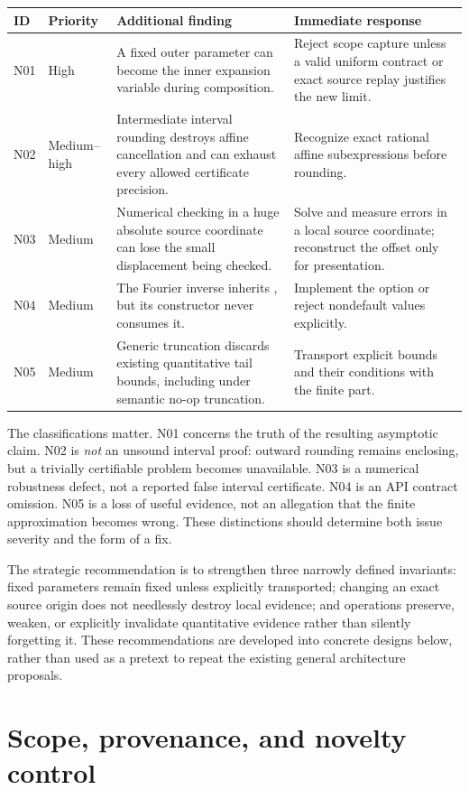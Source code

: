 \documentclass[11pt,a4paper]{article}
\newcommand{\code}[1]{\texttt{\detokenize{#1}}}
\begin{document}
\begin{longtable}{@{}L{11mm}L{20mm}L{57mm}L{69mm}@{}}
\toprule ID & Priority & Additional finding & Immediate response\\\midrule\endhead
N01 & High & A fixed outer parameter can become the inner expansion variable during composition. & Reject scope capture unless a valid uniform contract or exact source replay justifies the new limit.\\
N02 & Medium--high & Intermediate interval rounding destroys affine cancellation and can exhaust every allowed certificate precision. & Recognize exact rational affine subexpressions before rounding.\\
N03 & Medium & Numerical checking in a huge absolute source coordinate can lose the small displacement being checked. & Solve and measure errors in a local source coordinate; reconstruct the offset only for presentation.\\
N04 & Medium & The Fourier inverse inherits \code{SeriesTermGoal}, but its constructor never consumes it. & Implement the option or reject nondefault values explicitly.\\
N05 & Medium & Generic truncation discards existing quantitative tail bounds, including under semantic no-op truncation. & Transport explicit bounds and their conditions with the finite part.\\
\bottomrule
\end{longtable}

The classifications matter. N01 concerns the truth of the resulting asymptotic claim. N02 is \emph{not} an unsound interval proof: outward rounding remains enclosing, but a trivially certifiable problem becomes unavailable. N03 is a numerical robustness defect, not a reported false interval certificate. N04 is an API contract omission. N05 is a loss of useful evidence, not an allegation that the finite approximation becomes wrong. These distinctions should determine both issue severity and the form of a fix.

The strategic recommendation is to strengthen three narrowly defined invariants: fixed parameters remain fixed unless explicitly transported; changing an exact source origin does not needlessly destroy local evidence; and operations preserve, weaken, or explicitly invalidate quantitative evidence rather than silently forgetting it. These recommendations are developed into concrete designs below, rather than used as a pretext to repeat the existing general architecture proposals.

\section{Scope, provenance, and novelty control}\label{sec:scope}
\end{document}
